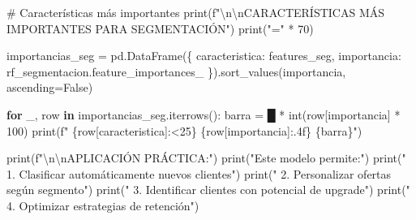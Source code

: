 \documentclass[
  doc,
  floatsintext,
  longtable,
  a4paper,
  nolmodern,
  notxfonts,
  notimes,
  12pt,
  colorlinks=true,linkcolor=blue,citecolor=blue,urlcolor=blue]{apa7}
\newenvironment{Shaded}{\begin{snugshade}}{\end{snugshade}}
\newcommand{\BuiltInTok}[1]{\textcolor[rgb]{0.00,0.23,0.31}{#1}}
\newcommand{\CharTok}[1]{\textcolor[rgb]{0.13,0.47,0.30}{#1}}
\newcommand{\CommentTok}[1]{\textcolor[rgb]{0.37,0.37,0.37}{#1}}
\newcommand{\ControlFlowTok}[1]{\textcolor[rgb]{0.00,0.23,0.31}{\textbf{#1}}}
\newcommand{\DecValTok}[1]{\textcolor[rgb]{0.68,0.00,0.00}{#1}}
\newcommand{\KeywordTok}[1]{\textcolor[rgb]{0.00,0.23,0.31}{\textbf{#1}}}
\newcommand{\NormalTok}[1]{\textcolor[rgb]{0.00,0.23,0.31}{#1}}
\newcommand{\OperatorTok}[1]{\textcolor[rgb]{0.37,0.37,0.37}{#1}}
\newcommand{\SpecialCharTok}[1]{\textcolor[rgb]{0.37,0.37,0.37}{#1}}
\newcommand{\SpecialStringTok}[1]{\textcolor[rgb]{0.13,0.47,0.30}{#1}}
\newcommand{\StringTok}[1]{\textcolor[rgb]{0.13,0.47,0.30}{#1}}
\newcommand{\VariableTok}[1]{\textcolor[rgb]{0.07,0.07,0.07}{#1}}
\begin{document}
\begin{Shaded}
\begin{Highlighting}[]
\CommentTok{\# Características más importantes}
\BuiltInTok{print}\NormalTok{(}\SpecialStringTok{f"}\CharTok{\textbackslash{}n\textbackslash{}n}\SpecialStringTok{CARACTERÍSTICAS MÁS IMPORTANTES PARA SEGMENTACIÓN"}\NormalTok{)}
\BuiltInTok{print}\NormalTok{(}\StringTok{"="} \OperatorTok{*} \DecValTok{70}\NormalTok{)}

\NormalTok{importancias\_seg }\OperatorTok{=}\NormalTok{ pd.DataFrame(\{}
    \StringTok{\textquotesingle{}caracteristica\textquotesingle{}}\NormalTok{: features\_seg,}
    \StringTok{\textquotesingle{}importancia\textquotesingle{}}\NormalTok{: rf\_segmentacion.feature\_importances\_}
\NormalTok{\}).sort\_values(}\StringTok{\textquotesingle{}importancia\textquotesingle{}}\NormalTok{, ascending}\OperatorTok{=}\VariableTok{False}\NormalTok{)}

\ControlFlowTok{for}\NormalTok{ \_, row }\KeywordTok{in}\NormalTok{ importancias\_seg.iterrows():}
\NormalTok{    barra }\OperatorTok{=} \StringTok{\textquotesingle{}█\textquotesingle{}} \OperatorTok{*} \BuiltInTok{int}\NormalTok{(row[}\StringTok{\textquotesingle{}importancia\textquotesingle{}}\NormalTok{] }\OperatorTok{*} \DecValTok{100}\NormalTok{)}
    \BuiltInTok{print}\NormalTok{(}\SpecialStringTok{f"  }\SpecialCharTok{\{}\NormalTok{row[}\StringTok{\textquotesingle{}caracteristica\textquotesingle{}}\NormalTok{]}\SpecialCharTok{:\textless{}25\}}\SpecialStringTok{ }\SpecialCharTok{\{}\NormalTok{row[}\StringTok{\textquotesingle{}importancia\textquotesingle{}}\NormalTok{]}\SpecialCharTok{:.4f\}}\SpecialStringTok{ }\SpecialCharTok{\{}\NormalTok{barra}\SpecialCharTok{\}}\SpecialStringTok{"}\NormalTok{)}

\BuiltInTok{print}\NormalTok{(}\SpecialStringTok{f"}\CharTok{\textbackslash{}n\textbackslash{}n}\SpecialStringTok{APLICACIÓN PRÁCTICA:"}\NormalTok{)}
\BuiltInTok{print}\NormalTok{(}\StringTok{"Este modelo permite:"}\NormalTok{)}
\BuiltInTok{print}\NormalTok{(}\StringTok{"  1. Clasificar automáticamente nuevos clientes"}\NormalTok{)}
\BuiltInTok{print}\NormalTok{(}\StringTok{"  2. Personalizar ofertas según segmento"}\NormalTok{)}
\BuiltInTok{print}\NormalTok{(}\StringTok{"  3. Identificar clientes con potencial de upgrade"}\NormalTok{)}
\BuiltInTok{print}\NormalTok{(}\StringTok{"  4. Optimizar estrategias de retención"}\NormalTok{)}
\end{Highlighting}
\end{Shaded}
\end{document}
